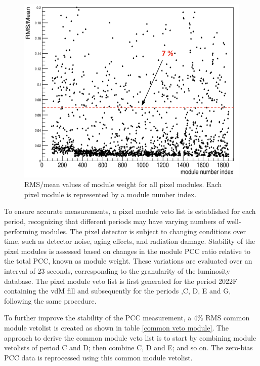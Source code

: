 \begin{center}
  \begin{figure}[h!]
    \centering
    \includegraphics[scale=.20]{Chapter4/RMSmean.png}
    \caption[RMS/mean Module  Stability]{ RMS/mean values of module weight for all pixel modules. Each pixel module is represented by a module number index.} 
    \label{goodmodule}
  \end{figure}
\end{center}

To ensure accurate measurements, a pixel module veto list is established for each period, recognizing that different periods may have varying numbers of well-performing modules. The pixel detector is subject to changing conditions over time, such as detector noise, aging effects, and radiation damage. Stability of the pixel modules is assessed based on changes in the module PCC ratio relative to the total PCC, known as module weight. These variations are evaluated over an interval of 23 seconds, corresponding to the granularity of the luminosity database. The pixel module veto list is first generated for the period 2022F containing the vdM fill and subsequently for the periods ,C, D, E and G,  following the same procedure.  

\noindent To further improve the stability of the PCC measurement, a 4\% RMS common module vetolist is created as shown in table \ref{common  veto module}. The approach to derive the common module veto list is to start by combining module vetolists of period C and D; then combine C, D and E; and so on. The zero-bias PCC data is reprocessed using this common module vetolist. 

